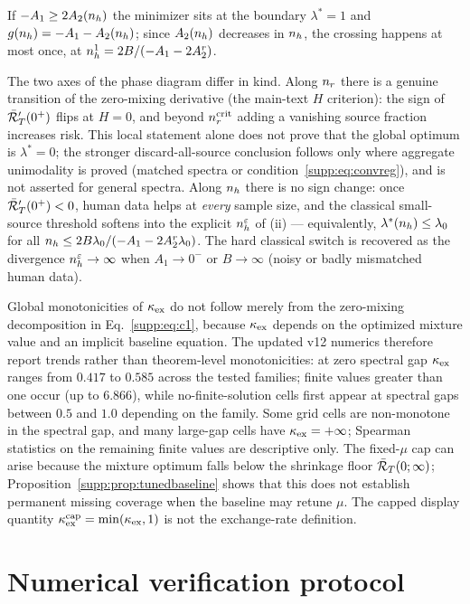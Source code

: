 If $-A_1 \ge 2A_2(n_h)$ the minimizer sits at the boundary $\lambda^* = 1$ and $g(n_h) = -A_1 - A_2(n_h)$; since $A_2(n_h)$ decreases in $n_h$, the crossing happens at most once, at $n_h^1 = 2B/(-A_1 - 2A_2^r)$.

\begin{remark}
The two axes of the phase diagram differ in kind.
Along $n_r$ there is a genuine transition of the zero-mixing derivative (the main-text $H$ criterion): the sign of $\bar{\mathcal{R}}_T'(0^+)$ flips at $H = 0$, and beyond $n_r^{\mathrm{crit}}$ adding a vanishing source fraction increases risk.
This local statement alone does not prove that the global optimum is $\lambda^*=0$; the stronger discard-all-source conclusion follows only where aggregate unimodality is proved (matched spectra or condition~\eqref{supp:eq:convreg}), and is not asserted for general spectra.
Along $n_h$ there is no sign change: once $\bar{\mathcal{R}}_T'(0^+) < 0$, human data helps at \emph{every} sample size, and the classical small-source threshold softens into the explicit $n_h^\varepsilon$ of (ii) --- equivalently, $\lambda^*(n_h) \le \lambda_0$ for all $n_h \le 2B\lambda_0/(-A_1 - 2A_2^r\lambda_0)$.
The hard classical switch is recovered as the divergence $n_h^\varepsilon \to \infty$ when $A_1 \to 0^-$ or $B \to \infty$ (noisy or badly mismatched human data).
\end{remark}

Global monotonicities of $\kappa_{\mathrm{ex}}$ do not follow merely from the zero-mixing decomposition in Eq.~\eqref{supp:eq:c1}, because $\kappa_{\mathrm{ex}}$ depends on the optimized mixture value and an implicit baseline equation.
The updated v12 numerics therefore report trends rather than theorem-level monotonicities: at zero spectral gap $\kappa_{\mathrm{ex}}$ ranges from $0.417$ to $0.585$ across the tested families; finite values greater than one occur (up to $6.866$), while no-finite-solution cells first appear at spectral gaps between $0.5$ and $1.0$ depending on the family.
Some grid cells are non-monotone in the spectral gap, and many large-gap cells have $\kappa_{\mathrm{ex}}=+\infty$; Spearman statistics on the remaining finite values are descriptive only.
The fixed-$\mu$ cap can arise because the mixture optimum falls below the shrinkage floor $\bar{\mathcal{R}}_T(0;\infty)$; Proposition~\ref{supp:prop:tunedbaseline} shows that this does not establish permanent missing coverage when the baseline may retune $\mu$.
The capped display quantity $\kappa_{\mathrm{ex}}^{\mathrm{cap}}=\min(\kappa_{\mathrm{ex}},1)$ is not the exchange-rate definition.

\section{Numerical verification protocol}
\label{supp:numerics}


